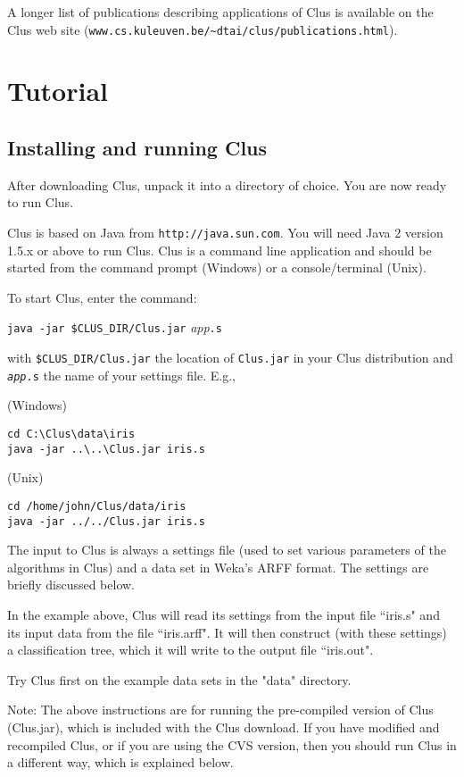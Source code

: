 \documentclass[a4paper]{report}
\begin{document}
A longer list of publications describing applications of Clus is available on the Clus web site
(\verb^www.cs.kuleuven.be/~dtai/clus/publications.html^).

\chapter{Tutorial}

\section{Installing and running Clus}

After downloading Clus, unpack it into a directory of choice.
You are now ready to run Clus.

Clus is based on Java from {\tt http://java.sun.com}. You will need 
Java 2 version 1.5.x or above to run Clus. Clus is a command line 
application and should be started from the command prompt
(Windows) or a console/terminal (Unix).

To start Clus, enter the command:
\begin{flushleft}
\verb^java -jar $CLUS_DIR/Clus.jar^ {\em app}\verb^.s^
\end{flushleft}

with \verb^$CLUS_DIR/Clus.jar^ the location of \verb^Clus.jar^ in your Clus 
distribution and {\tt {\em app}.s} the name of your settings file. E.g.,

(Windows)
\begin{verbatim}
cd C:\Clus\data\iris
java -jar ..\..\Clus.jar iris.s
\end{verbatim}

(Unix)
\begin{verbatim}
cd /home/john/Clus/data/iris
java -jar ../../Clus.jar iris.s
\end{verbatim}

The input to Clus is always a settings file (used to set various 
parameters of the algorithms in Clus) and a data set in Weka's 
ARFF format. The settings are briefly discussed below.

In the example above, Clus will read its settings from the input file 
``iris.s" and its input data from the file ``iris.arff". It will then construct 
(with these settings) a classification tree, which it will write to the 
output file ``iris.out".

Try Clus first on the example data sets in the "data" directory.

Note: The above instructions are for running the pre-compiled version 
of Clus (Clus.jar), which is included with the Clus download. If you have 
modified and recompiled Clus, or if you are using the CVS version, then
you should run Clus in a different way, which is explained below.
\end{document}
